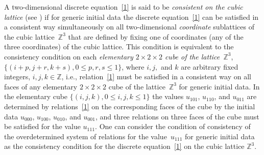 \documentclass[pdftex]{sigma}
\begin{document}
A two-dimensional discrete equation~\eqref{1} is said to be {\it
consistent on the cubic lattice} (see \cite{3, 4, 5, 6, 7}) if for generic
initial data the discrete equation~\eqref{1} can be satisf\/ied in a
consistent way simultaneously on all two-dimensional {\it
coordinate} sublattices of the cubic lattice~$\mathbb{Z}^3$ that are
def\/ined by f\/ixing one of coordinates (any of the three coordinates)
of the cubic lattice. This condition is equivalent to the
consistency condition on each {\it elementary $2 \times 2 \times 2$
cube of the lattice~$\mathbb{Z}^3$}, $\{(i + p, j + r, k + s),  0
\leq p, r, s \leq 1\}$, where $i, j,$ and $k$ are arbitrary f\/ixed
integers, $i, j, k \in \mathbb{Z}$, i.e., relation~\eqref{1} must be
satisf\/ied in a consistent way on all faces of any elementary $2
\times 2 \times 2$ cube of the lattice~$\mathbb{Z}^3$ for generic
initial data. In the elementary cube $\{(i, j, k), 0 \leq i, j, k
\leq 1 \}$ the values $u_{1 0 1}$, $u_{1 1 0}$, and $u_{0 1 1}$ are
determined by relations~\eqref{1} on the corresponding faces of the
cube by the initial data $u_{0 0 0}$, $u_{1 0 0}$, $u_{0 1 0}$, and
$u_{0 0 1}$, and three relations on three faces of the cube must be
satisf\/ied for the value $u_{1 1 1}$. One can consider the condition
of consistency of the overdetermined system of relations for the
value~$u_{1 1 1}$ for generic initial data as the consistency
condition for the discrete equation~\eqref{1} on the cubic lattice
$\mathbb{Z}^3$.
\end{document}
